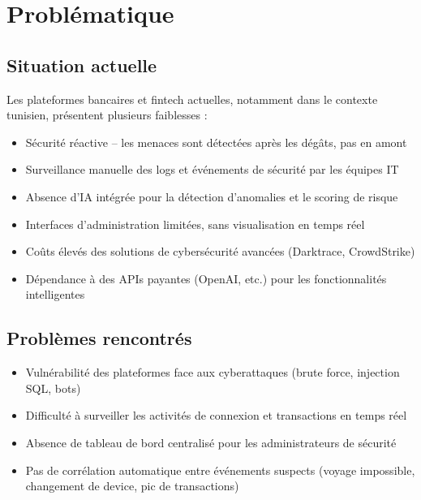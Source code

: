 \documentclass[12pt,a4paper]{report}
\begin{document}
\section{Problématique}

\subsection{Situation actuelle}
Les plateformes bancaires et fintech actuelles, notamment dans le contexte tunisien, présentent plusieurs faiblesses :
\begin{itemize}[leftmargin=*,label=--]
\item Sécurité réactive -- les menaces sont détectées après les dégâts, pas en amont
\item Surveillance manuelle des logs et événements de sécurité par les équipes IT
\item Absence d'IA intégrée pour la détection d'anomalies et le scoring de risque
\item Interfaces d'administration limitées, sans visualisation en temps réel
\item Coûts élevés des solutions de cybersécurité avancées (Darktrace, CrowdStrike)
\item Dépendance à des APIs payantes (OpenAI, etc.) pour les fonctionnalités intelligentes
\end{itemize}

\subsection{Problèmes rencontrés}
\begin{itemize}[leftmargin=*,label=--]
\item Vulnérabilité des plateformes face aux cyberattaques (brute force, injection SQL, bots)
\item Difficulté à surveiller les activités de connexion et transactions en temps réel
\item Absence de tableau de bord centralisé pour les administrateurs de sécurité
\item Pas de corrélation automatique entre événements suspects (voyage impossible, changement de device, pic de transactions)
\end{itemize}
\end{document}

